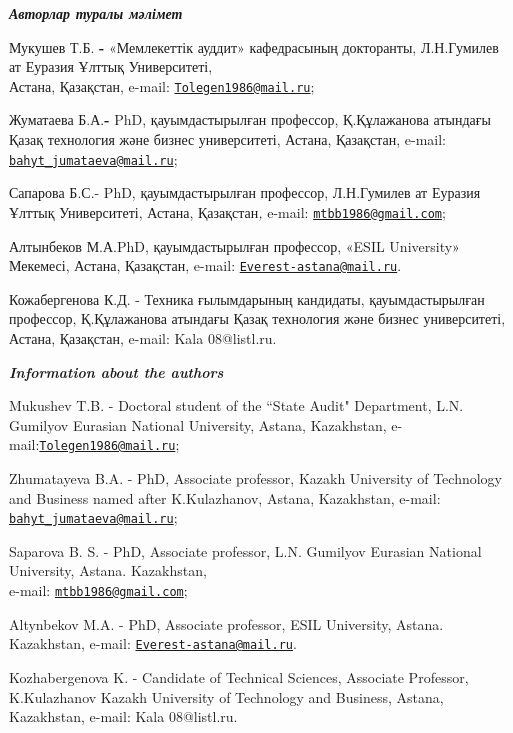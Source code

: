 \begin{authorinfo}
\hspace{1em}\emph{{\bfseries Авторлар туралы мәлімет}}

Мукушев Т.Б. {\bfseries -} «Мемлекеттік ауддит» кафедрасының докторанты,
Л.Н.Гумилев ат Еуразия Ұлттық Университеті,\\ Астана, Қазақстан, e-mail:
\href{mailto:Tolegen1986@mail.ru}{\nolinkurl{Tolegen1986@mail.ru}};

Жуматаева Б.А.{\bfseries -} PhD, қауымдастырылған профессор, Қ.Құлажанова
атындағы Қазақ технология және бизнес университеті, Астана, Қазақстан,
e-mail:
\href{mailto:bahyt_jumataeva@mail.ru}{\nolinkurl{bahyt\_jumataeva@mail.ru}};

Сапарова Б.С.- PhD, қауымдастырылған профессор, Л.Н.Гумилев ат Еуразия
Ұлттық Университеті, Астана, Қазақстан\emph{,} e-mail:
\href{mailto:mtbb1986@gmail.com}{\nolinkurl{mtbb1986@gmail.com}};

Алтынбеков М.А.PhD, қауымдастырылған профессор, «ESIL University»
Мекемесі, Астана, Қазақстан, e-mail:
\href{mailto:Everest-astana@mail.ru}{\nolinkurl{Everest-astana@mail.ru}}.

Кожабергенова К.Д. - Техника ғылымдарының кандидаты, қауымдастырылған профессор, Қ.Құлажанова  атындағы Қазақ технология және бизнес университеті,
Астана, Қазақстан, e-mail: Kala 08@listl.ru.

\hspace{1em}\emph{{\bfseries Information about the authors}}

Mukushev T.B. - Doctoral student of the ``State Audit" Department, L.N.
Gumilyov Eurasian National University, Astana, Kazakhstan,
e-mail:\href{mailto:Tolegen1986@mail.ru}{\nolinkurl{Tolegen1986@mail.ru}};

Zhumatayeva B.A. - PhD, Associate professor, Kazakh University of
Technology and Business named after K.Kulazhanov, Astana, Kazakhstan,
e-mail:
\href{mailto:bahyt_jumataeva@mail.ru}{\nolinkurl{bahyt\_jumataeva@mail.ru}};

Saparova B. S. - PhD, Associate professor, L.N. Gumilyov Eurasian
National University, Astana. Kazakhstan, \\e-mail:
\href{mailto:mtbb1986@gmail.com}{\nolinkurl{mtbb1986@gmail.com}};

Altynbekov M.A. - PhD, Associate professor, ESIL University, Astana.
Kazakhstan, e-mail:
\href{mailto:Everest-astana@mail.ru}{\nolinkurl{Everest-astana@mail.ru}}.

Kozhabergenova K. - Candidate of Technical Sciences, Associate Professor, K.Kulazhanov Kazakh University of Technology and Business,
 Astana, Kazakhstan, e-mail: Kala 08@listl.ru.
\end{authorinfo}

